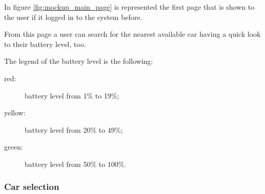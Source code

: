 In figure \ref{fig:mockup_main_page} is represented the first page that is shown to the user if it logged in to the system before.

From this page a user can search for the nearest available car having a quick look to their battery level, too.

The legend of the battery level is the following:
\begin{description}
	\item[red:] battery level from 1\% to 19\%;
	\item[yellow:] battery level from 20\% to 49\%;
	\item[green:] battery level from 50\% to 100\%.
\end{description}

\subsubsection*{Car selection}

